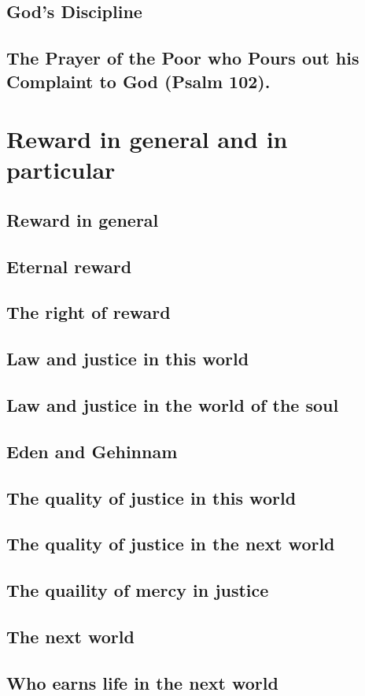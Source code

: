 \documentclass[11pt, a5paper, twoside, chapterprefix, openany]{scrbook}
\begin{document}
\chapter{God’s Discipline}
\chapter{The Prayer of the Poor who Pours out his Complaint to God (Psalm 102).}
\part{Reward in general and in particular}
\chapter{Reward in general}
\chapter{Eternal reward}
\chapter{The right of reward}
\chapter{Law and justice in this world}
\chapter{Law and justice in the world of the soul}
\chapter{Eden and Gehinnam}
\chapter{The quality of justice in this world}
\chapter{The quality of justice in the next world}
\chapter{The quaility of mercy in justice}
\chapter{The next world}
\chapter{Who earns life in the next world}
\end{document}
